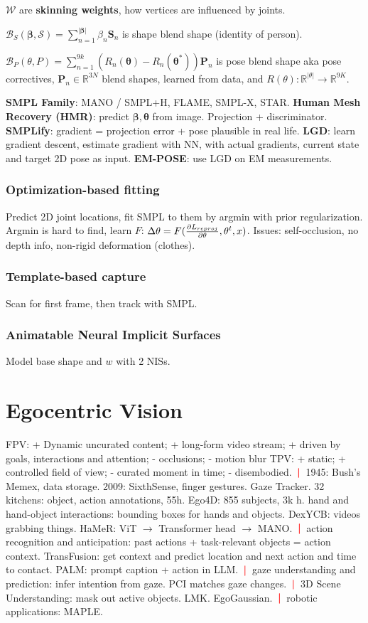 \documentclass[11pt,landscape,a4paper,fleqn]{article}
\newcommand{\sep}{\,\textcolor{red}{\bm|}\,}
\begin{document}
\begin{multicols*}{4}
$\mathcal{W}$ are \textbf{skinning weights}, how vertices are influenced by joints.

$\mathcal{B}_S(\boldsymbol{\beta}, \mathcal{S}) = \sum_{n=1}^{|\boldsymbol{\beta}|}{\beta_n\mathbf{S}_n}$ is shape blend shape (identity of person).

$\mathcal{B}_P(\theta, P) = \sum_{n=1}^{9k}(R_n(\boldsymbol{\theta}) - R_n(\boldsymbol{\theta}^*))\mathbf{P}_n$ is pose blend shape aka pose correctives, $\mathbf{P}_n\in\mathbb{R}^{3N}$ blend shapes, learned from data, and $R(\theta): \mathbb{R}^{|\theta|}\rightarrow \mathbb{R}^{9K}$.

\textbf{SMPL Family}: MANO / SMPL+H, FLAME, SMPL-X, STAR.
\textbf{Human Mesh Recovery (HMR)}: predict $\bm\beta, \bm\theta$ from image. Projection + discriminator.
\textbf{SMPLify}: gradient = projection error + pose plausible in real life.
\textbf{LGD}: learn gradient descent, estimate gradient with NN, with actual gradients, current state and target 2D pose as input.
\textbf{EM-POSE}: use LGD on EM measurements.
\subsubsection{Optimization-based fitting} Predict 2D joint locations,
fit SMPL to them by argmin with prior regularization.
Argmin is hard to find, learn $F$: $\Delta \theta = F(\pdv{L_{reproj}}{\theta}, \theta^t, x)$.
Issues: self-occlusion, no depth info, non-rigid deformation (clothes).

\subsubsection{Template-based capture}
Scan for first frame, then track with SMPL.

\subsubsection{Animatable Neural Implicit Surfaces}
Model base shape and $w$ with 2 NISs. 

\section{Egocentric Vision}
FPV: + Dynamic uncurated content; + long-form video stream; + driven by goals, interactions and attention; - occlusions; - motion blur
TPV: + static; + controlled field of view; - curated moment in time; - disembodied. $\sep$ 1945: Bush's Memex, data storage. 2009: SixthSense, finger gestures. Gaze Tracker. 32 kitchens: object, action annotations, 55h.
Ego4D: 855 subjects, 3k h. 
hand and hand-object interactions: bounding boxes for hands and objects. DexYCB: videos grabbing things. HaMeR: ViT $\rightarrow$ Transformer head $\rightarrow$ MANO. 
$\sep$ action recognition and anticipation: past actions + task-relevant objects = action context. TransFusion: get context and predict location and next action and time to contact. PALM: prompt caption + action in LLM. 
$\sep$ gaze understanding and prediction: infer intention from gaze. PCI matches gaze changes. 
$\sep$  3D Scene Understanding: mask out active objects. LMK. EgoGaussian.
$\sep$ robotic applications: MAPLE.



\end{multicols*}
\end{document}
